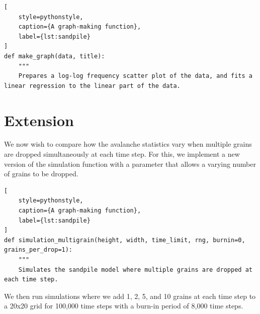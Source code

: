 \begin{lstlisting}[
    style=pythonstyle,
    caption={A graph-making function},
    label={lst:sandpile}
]
def make_graph(data, title):
    """
    Prepares a log-log frequency scatter plot of the data, and fits a linear regression to the linear part of the data.
\end{lstlisting}




\section{Extension}

We now wish to compare how the avalanche statistics vary when multiple grains are dropped simultaneously at each time step. For this, we implement a new version of the simulation function with a parameter that allows a varying number of grains to be dropped.


\begin{lstlisting}[
    style=pythonstyle,
    caption={A graph-making function},
    label={lst:sandpile}
]
def simulation_multigrain(height, width, time_limit, rng, burnin=0, grains_per_drop=1):
    """
    Simulates the sandpile model where multiple grains are dropped at each time step.
\end{lstlisting}

We then run simulations where we add 1, 2, 5, and 10 grains at each time step to a 20x20 grid for 100,000 time steps with a burn-in period of 8,000 time steps.
